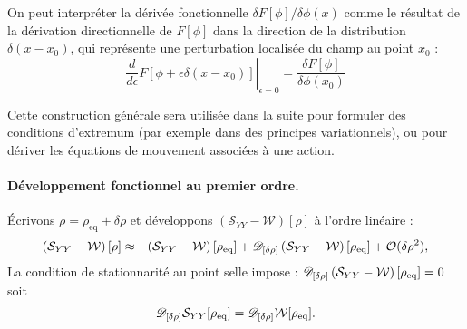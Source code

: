 On peut interpréter la dérivée fonctionnelle $\delta F[\phi]/\delta \phi(x)$ comme le résultat de la dérivation directionnelle de $F[\phi]$ dans la direction de la distribution $\delta(x - x_0)$, qui représente une perturbation localisée du champ au point $x_0$ :
\begin{equation}\label{chap2:eq.diff.q.3}
	\left. \frac{d}{d\epsilon} F[\phi + \epsilon \delta(x - x_0)] \right|_{\epsilon = 0} = \frac{\delta F[\phi]}{\delta \phi(x_0)}
\end{equation}

%
%
%

Cette construction générale sera utilisée dans la suite pour formuler des conditions d’extremum (par exemple dans des principes variationnels), ou pour dériver les équations de mouvement associées à une action.



\paragraph{Développement fonctionnel au premier ordre.}

Écrivons
\(
\rho=\rho_{\text{eq}}+\delta\rho
\)
et développons $(\mathcal{S}_{YY}-\mathcal{W})[\rho]$ à l’ordre linéaire :
\begin{eqnarray*}
	\left(  \mathcal{S}_{YY} - \mathcal{W }\right )[\rho] & \approx &\left(  \mathcal{S}_{YY} - \mathcal{W}\right )[ \rho_{\mathrm{eq}}] +  \mathscr{D}_{[\delta \rho]}\left (  \mathcal{S}_{YY} - \mathcal{W}\right )[ \rho_{\mathrm{eq}}]  + \mathcal{O}(\delta \rho^2 ) ,
	\label{chap:TBA:eq:action}	
\end{eqnarray*}	
La condition de stationnarité au point selle impose :
\(
	\mathscr{D}_{[\delta \rho]}\left (  \mathcal{S}_{YY} - \mathcal{W}\right )[ \rho_{\mathrm{eq}}] 	  =  0  	
\)
soit 
\begin{equation}
	\mathscr{D}_{[\delta \rho]} \mathcal{S}_{YY}[ \rho_{\mathrm{eq}}]  = \mathscr{D}_{[\delta \rho]}\mathcal{W}[ \rho_{\mathrm{eq}}] . \label{chap:TBA:eq:stationnarite}
\end{equation}

